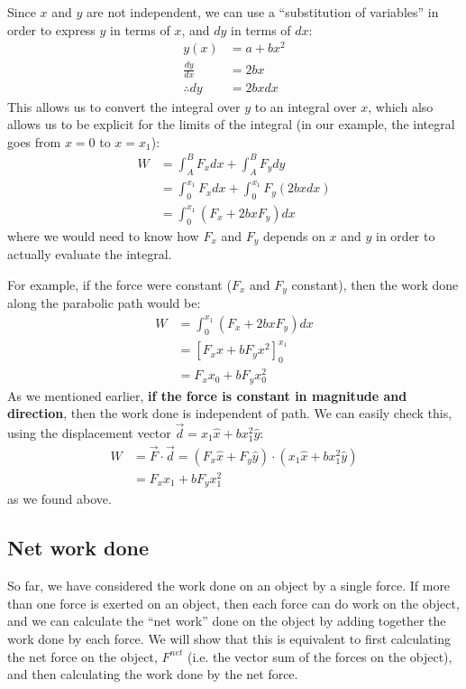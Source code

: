 \begin{example}
Since $x$ and $y$ are not independent, we can use a ``substitution of variables'' in order to express $y$ in terms of $x$, and $dy$ in terms of $dx$:
\begin{align*}
y(x) &= a + bx^2\\
\frac{dy}{dx} &= 2bx\\
\therefore dy &= 2bxdx
\end{align*} 
This allows us to convert the integral over $y$ to an integral over $x$, which also allows us to be explicit for the limits of the integral (in our example, the integral goes from $x=0$ to $x=x_1$):
\begin{align*}
W&= \int_A^B F_x dx + \int_A^B F_ydy\\
&=\int_0^{x_1} F_x dx + \int_0^{x_1} F_y(2bxdx)\\
&=\int_0^{x_1} (F_x + 2bxF_y)dx
\end{align*}
where we would need to know how $F_x$ and $F_y$ depends on $x$ and $y$ in order to actually evaluate the integral.

For example, if the force were constant ($F_x$ and $F_y$ constant), then the work done along the parabolic path would be:
\begin{align*}
W &= \int_0^{x_1} (F_x + 2bxF_y)dx\\
&=\left[F_x x + bF_yx^2  \right]_0^{x_1}\\
&=F_x x_0 + bF_yx_0^2
\end{align*}
As we mentioned earlier, \textbf{if the force is constant in magnitude and direction}, then the work done is independent of path. We can easily check this, using the displacement vector $\vec d = x_1\hat x + bx_1^2 \hat y$:
\begin{align*}
W &= \vec F \cdot \vec d = (F_x\hat x+ F_y\hat y) \cdot (x_1\hat x + bx_1^2 \hat y)\\
&=F_x x_1 + bF_yx_1^2
\end{align*}
as we found above. 
\end{example}

\subsection{Net work done}
So far, we have considered the work done on an object by a single force. If more than one force is exerted on an object, then each force can do work on the object, and we can calculate the ``net work'' done on the object by adding together the work done by each force. We will show that this is equivalent to first calculating the net force on the object, $F^{net}$ (i.e. the vector sum of the forces on the object), and then calculating the work done by the net force.
 

